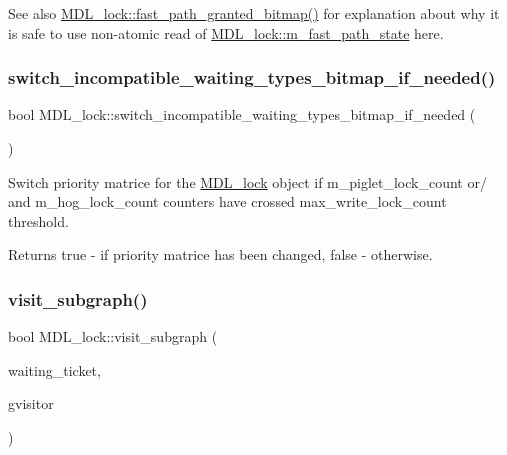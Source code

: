 \begin{DoxySeeAlso}{See also}
\mbox{\hyperlink{classMDL__lock_a44d77e8b91c3f09ac46adb6dccf7a460}{M\+D\+L\+\_\+lock\+::fast\+\_\+path\+\_\+granted\+\_\+bitmap()}} for explanation about why it is safe to use non-\/atomic read of \mbox{\hyperlink{classMDL__lock_ae680877b7079a862d294ccbefed6372c}{M\+D\+L\+\_\+lock\+::m\+\_\+fast\+\_\+path\+\_\+state}} here. 
\end{DoxySeeAlso}
\mbox{\label{classMDL__lock_ab2be5e68445003d7a516849f2bceb18c}} 
\subsubsection{\texorpdfstring{switch\+\_\+incompatible\+\_\+waiting\+\_\+types\+\_\+bitmap\+\_\+if\+\_\+needed()}{switch\_incompatible\_waiting\_types\_bitmap\_if\_needed()}}
{\footnotesize\ttfamily bool M\+D\+L\+\_\+lock\+::switch\+\_\+incompatible\+\_\+waiting\+\_\+types\+\_\+bitmap\+\_\+if\+\_\+needed (\begin{DoxyParamCaption}{ }\end{DoxyParamCaption})\hspace{0.3cm}{\ttfamily [inline]}}

Switch priority matrice for the \mbox{\hyperlink{classMDL__lock}{M\+D\+L\+\_\+lock}} object if m\+\_\+piglet\+\_\+lock\+\_\+count or/ and m\+\_\+hog\+\_\+lock\+\_\+count counters have crossed max\+\_\+write\+\_\+lock\+\_\+count threshold.

\begin{DoxyReturn}{Returns}
true -\/ if priority matrice has been changed, false -\/ otherwise. 
\end{DoxyReturn}
\mbox{\label{classMDL__lock_a56e5025d3f3cff97923bc283c715566d}} 
\subsubsection{\texorpdfstring{visit\+\_\+subgraph()}{visit\_subgraph()}}
{\footnotesize\ttfamily bool M\+D\+L\+\_\+lock\+::visit\+\_\+subgraph (\begin{DoxyParamCaption}\item[{\mbox{\hyperlink{classMDL__ticket}{M\+D\+L\+\_\+ticket}} $\ast$}]{waiting\+\_\+ticket,  }\item[{\mbox{\hyperlink{classMDL__wait__for__graph__visitor}{M\+D\+L\+\_\+wait\+\_\+for\+\_\+graph\+\_\+visitor}} $\ast$}]{gvisitor }\end{DoxyParamCaption})}

